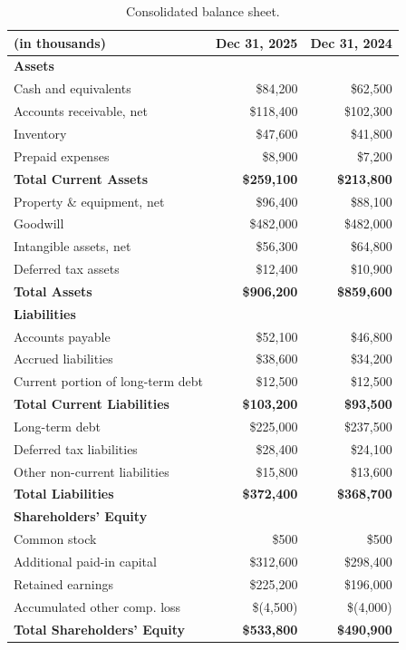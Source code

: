 \documentclass[
    language=english,
    doctype=audit-report,
    institution=none,
]{../../omnilatex}
\begin{document}
\begin{table}[h]
    \centering
    \begin{tabular}{lrr}
        \toprule
        \textbf{(in thousands)} & \textbf{Dec 31, 2025} & \textbf{Dec 31, 2024} \\
        \midrule
        \textbf{Assets} & & \\
        \quad Cash and equivalents & \$84,200 & \$62,500 \\
        \quad Accounts receivable, net & \$118,400 & \$102,300 \\
        \quad Inventory & \$47,600 & \$41,800 \\
        \quad Prepaid expenses & \$8,900 & \$7,200 \\
        \midrule
        \textbf{Total Current Assets} & \textbf{\$259,100} & \textbf{\$213,800} \\
        \midrule
        \quad Property \& equipment, net & \$96,400 & \$88,100 \\
        \quad Goodwill & \$482,000 & \$482,000 \\
        \quad Intangible assets, net & \$56,300 & \$64,800 \\
        \quad Deferred tax assets & \$12,400 & \$10,900 \\
        \midrule
        \textbf{Total Assets} & \textbf{\$906,200} & \textbf{\$859,600} \\
        \midrule
        \textbf{Liabilities} & & \\
        \quad Accounts payable & \$52,100 & \$46,800 \\
        \quad Accrued liabilities & \$38,600 & \$34,200 \\
        \quad Current portion of long-term debt & \$12,500 & \$12,500 \\
        \midrule
        \textbf{Total Current Liabilities} & \textbf{\$103,200} & \textbf{\$93,500} \\
        \midrule
        \quad Long-term debt & \$225,000 & \$237,500 \\
        \quad Deferred tax liabilities & \$28,400 & \$24,100 \\
        \quad Other non-current liabilities & \$15,800 & \$13,600 \\
        \midrule
        \textbf{Total Liabilities} & \textbf{\$372,400} & \textbf{\$368,700} \\
        \midrule
        \textbf{Shareholders' Equity} & & \\
        \quad Common stock & \$500 & \$500 \\
        \quad Additional paid-in capital & \$312,600 & \$298,400 \\
        \quad Retained earnings & \$225,200 & \$196,000 \\
        \quad Accumulated other comp. loss & \$(4,500) & \$(4,000) \\
        \midrule
        \textbf{Total Shareholders' Equity} & \textbf{\$533,800} & \textbf{\$490,900} \\
        \bottomrule
    \end{tabular}
    \caption{Consolidated balance sheet.}
\end{table}
\end{document}
